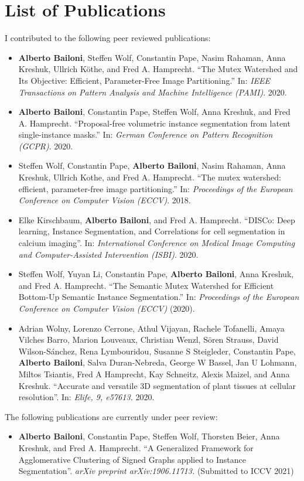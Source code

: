 

\chapter*{List of Publications}

I contributed to the following peer reviewed publications:

\begin{itemize}
\item \textbf{Alberto Bailoni}, Steffen Wolf, Constantin Pape, Nasim Rahaman, Anna Kreshuk, Ullrich Köthe, and Fred A. Hamprecht. ``The Mutex Watershed and Its Objective: Efficient, Parameter-Free Image Partitioning.'' In: \emph{IEEE Transactions on Pattern Analysis and Machine Intelligence (PAMI)}. 2020.
\item \textbf{Alberto Bailoni}, Constantin Pape, Steffen Wolf, Anna Kreshuk, and Fred A. Hamprecht. ``Proposal-free volumetric instance segmentation from latent single-instance masks.'' In: \emph{ German Conference on Pattern Recognition (GCPR)}. 2020.
\item Steffen Wolf, Constantin Pape, \textbf{Alberto Bailoni}, Nasim Rahaman, Anna Kreshuk, Ullrich Kothe, and Fred A. Hamprecht. ``The mutex watershed: efficient, parameter-free image partitioning.'' In: \emph{Proceedings of the European Conference on Computer Vision (ECCV)}. 2018.
\item Elke Kirschbaum, \textbf{Alberto Bailoni}, and Fred A. Hamprecht. ``DISCo: Deep learning, Instance Segmentation, and Correlations for cell segmentation in calcium imaging''. In: \emph{International Conference on Medical Image Computing and Computer-Assisted Intervention (ISBI)}. 2020.
\item Steffen Wolf, Yuyan Li, Constantin Pape, \textbf{Alberto Bailoni}, Anna Kreshuk, and Fred A. Hamprecht. ``The Semantic Mutex Watershed for Efficient Bottom-Up Semantic Instance Segmentation.'' In: \emph{Proceedings of the European Conference on Computer Vision (ECCV)} (2020).
\item Adrian Wolny, Lorenzo Cerrone, Athul Vijayan, Rachele Tofanelli, Amaya Vilches Barro, Marion Louveaux, Christian Wenzl, Sören Strauss, David Wilson-Sánchez, Rena Lymbouridou, Susanne S Steigleder, Constantin Pape, \textbf{Alberto Bailoni}, Salva Duran-Nebreda, George W Bassel, Jan U Lohmann, Miltos Tsiantis, Fred A Hamprecht, Kay Schneitz, Alexis Maizel, and Anna Kreshuk. ``Accurate and versatile 3D segmentation of plant tissues at cellular resolution''. In: \emph{Elife, 9, e57613.} 2020.
\end{itemize}

\noindent The following publications are currently under peer review:
\begin{itemize}
\item \textbf{Alberto Bailoni}, Constantin Pape, Steffen Wolf, Thorsten Beier, Anna Kreshuk, and Fred A. Hamprecht. ``A Generalized Framework for Agglomerative Clustering of Signed Graphs applied to Instance Segmentation''. \emph{arXiv preprint arXiv:1906.11713.} (Submitted to ICCV 2021)
\end{itemize}
